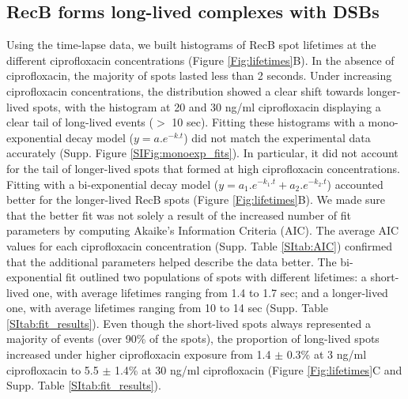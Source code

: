 \subsection*{RecB forms long-lived complexes with DSBs}
Using the time-lapse data, we built histograms of RecB spot lifetimes at the different ciprofloxacin concentrations (Figure \ref{Fig:lifetimes}B). In the absence of ciprofloxacin, the majority of spots lasted less than 2 seconds. Under increasing ciprofloxacin concentrations, the distribution showed a clear shift towards longer-lived spots, with the histogram at 20 and 30 ng/ml ciprofloxacin displaying a clear tail of long-lived events ($>$ 10 sec). Fitting these histograms with a mono-exponential decay model ($y = a.e^{-k.t}$) did not match the experimental data accurately (Supp. Figure \ref{SIFig:monoexp_fits}). In particular, it did not account for the tail of longer-lived spots that formed at high ciprofloxacin concentrations. Fitting with a bi-exponential decay model ($y = a_1.e^{-k_1.t} + a_2.e^{-k_2.t}$) accounted better for the longer-lived RecB spots (Figure \ref{Fig:lifetimes}B). We made sure that the better fit was not solely a result of the increased number of fit parameters by computing Akaike's Information Criteria (AIC). The average AIC values for each ciprofloxacin concentration (Supp. Table \ref{SItab:AIC}) confirmed that the additional parameters helped describe the data better. The bi-exponential fit outlined two populations of spots with different lifetimes: a short-lived one, with average lifetimes ranging from 1.4 to 1.7 sec; and a longer-lived one, with average lifetimes ranging from 10 to 14 sec (Supp. Table \ref{SItab:fit_results}). Even though the short-lived spots always represented a majority of events (over 90\% of the spots), the proportion of long-lived spots increased under higher ciprofloxacin exposure from 1.4 $\pm$ 0.3\% at 3 ng/ml ciprofloxacin to 5.5 $\pm$ 1.4\% at 30 ng/ml ciprofloxacin (Figure \ref{Fig:lifetimes}C and Supp. Table \ref{SItab:fit_results}).

